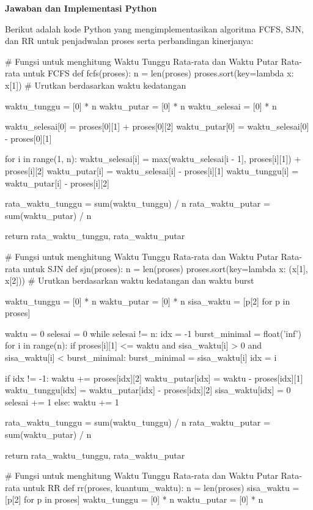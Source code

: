 \documentclass[12pt]{article}
\begin{document}
\textbf{Jawaban dan Implementasi Python}

Berikut adalah kode Python yang mengimplementasikan algoritma FCFS, SJN, dan RR untuk penjadwalan proses serta perbandingan kinerjanya:

\begin{python}
# Fungsi untuk menghitung Waktu Tunggu Rata-rata dan Waktu Putar Rata-rata untuk FCFS
def fcfs(proses):
    n = len(proses)
    proses.sort(key=lambda x: x[1])  # Urutkan berdasarkan waktu kedatangan

    waktu_tunggu = [0] * n
    waktu_putar = [0] * n
    waktu_selesai = [0] * n

    waktu_selesai[0] = proses[0][1] + proses[0][2]
    waktu_putar[0] = waktu_selesai[0] - proses[0][1]
    
    for i in range(1, n):
        waktu_selesai[i] = max(waktu_selesai[i - 1], proses[i][1]) + proses[i][2]
        waktu_putar[i] = waktu_selesai[i] - proses[i][1]
        waktu_tunggu[i] = waktu_putar[i] - proses[i][2]

    rata_waktu_tunggu = sum(waktu_tunggu) / n
    rata_waktu_putar = sum(waktu_putar) / n

    return rata_waktu_tunggu, rata_waktu_putar

# Fungsi untuk menghitung Waktu Tunggu Rata-rata dan Waktu Putar Rata-rata untuk SJN
def sjn(proses):
    n = len(proses)
    proses.sort(key=lambda x: (x[1], x[2]))  # Urutkan berdasarkan waktu kedatangan dan waktu burst

    waktu_tunggu = [0] * n
    waktu_putar = [0] * n
    sisa_waktu = [p[2] for p in proses]

    waktu = 0
    selesai = 0
    while selesai != n:
        idx = -1
        burst_minimal = float('inf')
        for i in range(n):
            if proses[i][1] <= waktu and sisa_waktu[i] > 0 and sisa_waktu[i] < burst_minimal:
                burst_minimal = sisa_waktu[i]
                idx = i
        
        if idx != -1:
            waktu += proses[idx][2]
            waktu_putar[idx] = waktu - proses[idx][1]
            waktu_tunggu[idx] = waktu_putar[idx] - proses[idx][2]
            sisa_waktu[idx] = 0
            selesai += 1
        else:
            waktu += 1

    rata_waktu_tunggu = sum(waktu_tunggu) / n
    rata_waktu_putar = sum(waktu_putar) / n

    return rata_waktu_tunggu, rata_waktu_putar

# Fungsi untuk menghitung Waktu Tunggu Rata-rata dan Waktu Putar Rata-rata untuk RR
def rr(proses, kuantum_waktu):
    n = len(proses)
    sisa_waktu = [p[2] for p in proses]
    waktu_tunggu = [0] * n
    waktu_putar = [0] * n


\end{python}
\end{document}

